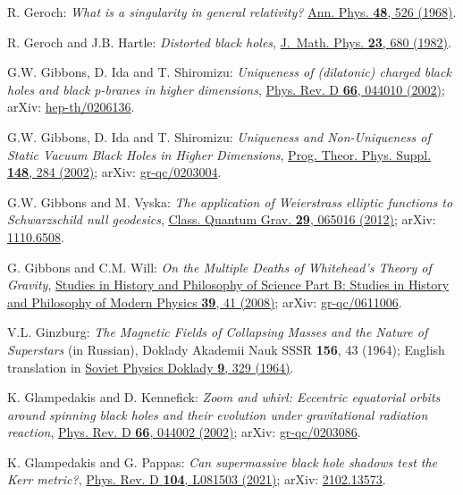 \begin{thebibliography}{123}
R. Geroch:
{\em What is a singularity in general relativity?}
\href{https://doi.org/10.1016/0003-4916(68)90144-9}{Ann. Phys. {\bf 48}, 526 (1968)}.

R. Geroch and J.B. Hartle:
{\em Distorted black holes},
\href{https://doi.org/10.1063/1.525384}{J.~Math. Phys. {\bf 23}, 680 (1982)}.

G.W. Gibbons, D. Ida and T. Shiromizu:
{\em Uniqueness of (dilatonic) charged black holes and black p-branes in higher dimensions},
\href{https://doi.org/10.1103/PhysRevD.66.044010}{Phys. Rev. D {\bf 66}, 044010 (2002)};
arXiv: \href{https://arxiv.org/abs/hep-th/0206136}{hep-th/0206136}.

G.W. Gibbons, D. Ida and T. Shiromizu:
{\em Uniqueness and Non-Uniqueness of Static Vacuum Black Holes in Higher Dimensions},
\href{https://doi.org/10.1143/PTPS.148.284}{Prog. Theor. Phys. Suppl. {\bf 148}, 284 (2002)};
arXiv: \href{https://arxiv.org/abs/gr-qc/0203004}{gr-qc/0203004}.

G.W. Gibbons and M. Vyska:
{\em The application of Weierstrass elliptic functions to Schwarzschild null geodesics},
\href{https://doi.org/10.1088/0264-9381/29/6/065016}{Class. Quantum Grav. {\bf 29}, 065016 (2012)};
arXiv: \href{https://arxiv.org/abs/1110.6508}{1110.6508}.

G. Gibbons and C.M. Will: {\em On the Multiple Deaths of Whitehead's Theory of Gravity},
\href{https://doi.org/10.1016/j.shpsb.2007.04.004}{Studies in History and Philosophy of Science Part B: Studies in History and Philosophy of Modern Physics {\bf 39}, 41 (2008)};
arXiv: \href{https://arxiv.org/abs/gr-qc/0611006}{gr-qc/0611006}.

V.L. Ginzburg:
{\em The Magnetic Fields of Collapsing Masses and the Nature of Superstars}
(in Russian),
Doklady Akademii Nauk SSSR {\bf 156}, 43 (1964); English translation in
\href{https://www.mathnet.ru/eng/dan/v156/i1/p43}{Soviet Physics Doklady {\bf 9}, 329 (1964)}.

K. Glampedakis and D. Kennefick:
{\em Zoom and whirl: Eccentric equatorial orbits around spinning black holes and their evolution under gravitational radiation reaction},
\href{https://doi.org/10.1103/PhysRevD.66.044002}{Phys. Rev. D {\bf 66}, 044002 (2002)};
arXiv: \href{https://arxiv.org/abs/gr-qc/0203086}{gr-qc/0203086}.

K. Glampedakis and G. Pappas:
{\em Can supermassive black hole shadows test the Kerr metric?},
\href{https://doi.org/10.1103/PhysRevD.104.L081503}{Phys. Rev. D {\bf 104}, L081503 (2021)};
arXiv: \href{https://arxiv.org/abs/2102.13573}{2102.13573}.


\end{thebibliography}
